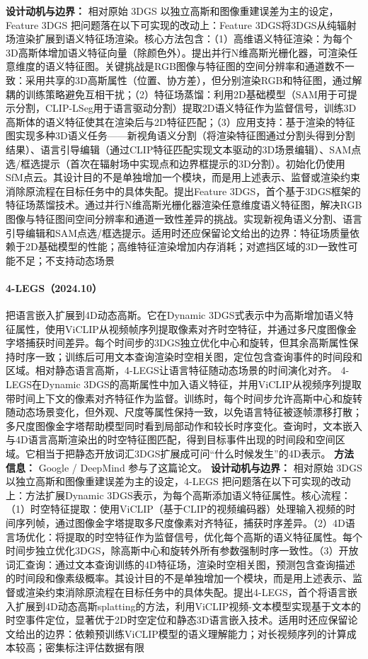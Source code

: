 \textbf{设计动机与边界：} 相对原始 3DGS 以独立高斯和图像重建误差为主的设定，Feature 3DGS 把问题落在以下可实现的改动上：Feature 3DGS将3DGS从纯辐射场渲染扩展到语义特征场渲染。核心方法包含：（1）高维语义特征渲染：为每个3D高斯体增加语义特征向量（除颜色外）。提出并行N维高斯光栅化器，可渲染任意维度的语义特征图。关键挑战是RGB图像与特征图的空间分辨率和通道数不一致：采用共享的3D高斯属性（位置、协方差），但分别渲染RGB和特征图，通过解耦的训练策略避免互相干扰；（2）特征场蒸馏：利用2D基础模型（SAM用于可提示分割，CLIP-LSeg用于语言驱动分割）提取2D语义特征作为监督信号，训练3D高斯体的语义特征使其在渲染后与2D特征匹配；（3）应用支持：基于渲染的特征图实现多种3D语义任务——新视角语义分割（将渲染特征图通过分割头得到分割结果）、语言引导编辑（通过CLIP特征匹配实现文本驱动的3D场景编辑）、SAM点选/框选提示（首次在辐射场中实现点和边界框提示的3D分割）。初始化仍使用SfM点云。其设计目的不是单独增加一个模块，而是用上述表示、监督或渲染约束消除原流程在目标任务中的具体失配。提出Feature 3DGS，首个基于3DGS框架的特征场蒸馏技术。通过并行N维高斯光栅化器渲染任意维度语义特征图，解决RGB图像与特征图间空间分辨率和通道一致性差异的挑战。实现新视角语义分割、语言引导编辑和SAM点选/框选提示。适用时还应保留论文给出的边界：特征场质量依赖于2D基础模型的性能；高维特征渲染增加内存消耗；对遮挡区域的3D一致性可能不足；不支持动态场景
\paragraph{4-LEGS（2024.10）\cite{2410_10719}}
把语言嵌入扩展到4D动态高斯。它在Dynamic 3DGS式表示中为高斯增加语义特征属性，使用ViCLIP从视频帧序列提取像素对齐时空特征，并通过多尺度图像金字塔捕获时间差异。每个时间步的3DGS独立优化中心和旋转，但其余高斯属性保持时序一致；训练后可用文本查询渲染时空相关图，定位包含查询事件的时间段和区域。相对静态语言高斯，4-LEGS让语言特征随动态场景的时间演化对齐。
4-LEGS在Dynamic 3DGS的高斯属性中加入语义特征，并用ViCLIP从视频序列提取带时间上下文的像素对齐特征作为监督。训练时，每个时间步允许高斯中心和旋转随动态场景变化，但外观、尺度等属性保持一致，以免语言特征被逐帧漂移打散；多尺度图像金字塔帮助模型同时看到局部动作和较长时序变化。查询时，文本嵌入与4D语言高斯渲染出的时空特征图匹配，得到目标事件出现的时间段和空间区域。它相当于把静态开放词汇3DGS扩展成可问“什么时候发生”的4D表示。
\textbf{方法信息：} Google / DeepMind 参与了这篇论文。
\textbf{设计动机与边界：} 相对原始 3DGS 以独立高斯和图像重建误差为主的设定，4-LEGS 把问题落在以下可实现的改动上：方法扩展Dynamic 3DGS表示，为每个高斯添加语义特征属性。核心流程：（1）时空特征提取：使用ViCLIP（基于CLIP的视频编码器）处理输入视频的时间序列帧，通过图像金字塔提取多尺度像素对齐特征，捕获时序差异。（2）4D语言场优化：将提取的时空特征作为监督信号，优化每个高斯的语义特征属性。每个时间步独立优化3DGS，除高斯中心和旋转外所有参数强制时序一致性。（3）开放词汇查询：通过文本查询训练的4D特征场，渲染时空相关图，预测包含查询描述的时间段和像素级概率。其设计目的不是单独增加一个模块，而是用上述表示、监督或渲染约束消除原流程在目标任务中的具体失配。提出4-LEGS，首个将语言嵌入扩展到4D动态高斯splatting的方法，利用ViCLIP视频-文本模型实现基于文本的时空事件定位，显著优于2D时空定位和静态3D语言嵌入技术。适用时还应保留论文给出的边界：依赖预训练ViCLIP模型的语义理解能力；对长视频序列的计算成本较高；密集标注评估数据有限
